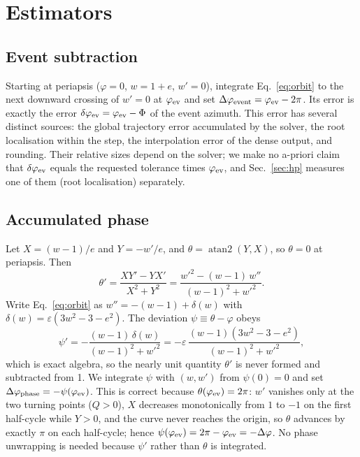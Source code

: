 \documentclass[11pt,a4paper]{article}
\newcommand{\dphi}{\Delta\varphi}
\begin{document}
\section{Estimators}
\label{sec:est}

\subsection{Event subtraction}
Starting at periapsis ($\varphi=0$, $w=1+e$, $w'=0$), integrate Eq.~\eqref{eq:orbit} to the next downward crossing of $w'=0$ at $\varphi_{\rm ev}$ and set $\dphi_{\rm event}=\varphi_{\rm ev}-2\pi$. Its error is exactly the error $\delta\varphi_{\rm ev}=\varphi_{\rm ev}-\Phi$ of the event azimuth. This error has several distinct sources: the global trajectory error accumulated by the solver, the root localisation within the step, the interpolation error of the dense output, and rounding. Their relative sizes depend on the solver; we make no a-priori claim that $\delta\varphi_{\rm ev}$ equals the requested tolerance times $\varphi_{\rm ev}$, and Sec.~\ref{sec:hp} measures one of them (root localisation) separately.

\subsection{Accumulated phase}
Let $X=(w-1)/e$ and $Y=-w'/e$, and $\theta=\operatorname{atan2}(Y,X)$, so $\theta=0$ at periapsis. Then
\begin{equation}
\theta'=\frac{XY'-YX'}{X^2+Y^2}=\frac{w'^2-(w-1)\,w''}{(w-1)^2+w'^2}.
\end{equation}
Write Eq.~\eqref{eq:orbit} as $w''=-(w-1)+\delta(w)$ with $\delta(w)=\varepsilon(3w^2-3-e^2)$. The deviation $\psi\equiv\theta-\varphi$ obeys
\begin{equation}
\psi'=-\frac{(w-1)\,\delta(w)}{(w-1)^2+w'^2}
=-\varepsilon\,\frac{(w-1)(3w^2-3-e^2)}{(w-1)^2+w'^2},
\label{eq:psi}
\end{equation}
which is exact algebra, so the nearly unit quantity $\theta'$ is never formed and subtracted from 1. We integrate $\psi$ with $(w,w')$ from $\psi(0)=0$ and set $\dphi_{\rm phase}=-\psi(\varphi_{\rm ev})$. This is correct because $\theta(\varphi_{\rm ev})=2\pi$: $w'$ vanishes only at the two turning points ($Q>0$), $X$ decreases monotonically from $1$ to $-1$ on the first half-cycle while $Y>0$, and the curve never reaches the origin, so $\theta$ advances by exactly $\pi$ on each half-cycle; hence $\psi(\varphi_{\rm ev})=2\pi-\varphi_{\rm ev}=-\dphi$. No phase unwrapping is needed because $\psi'$ rather than $\theta$ is integrated.
\end{document}
